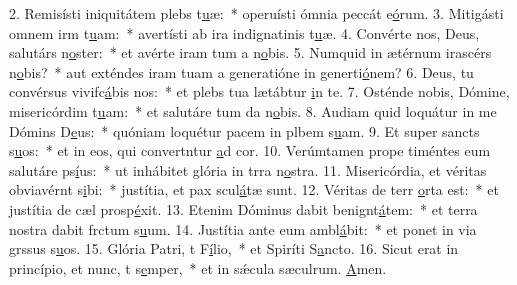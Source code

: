 2. Remisísti iniquitátem plebs t\uline{u}æ:~* operuísti ómnia peccát e\uline{ó}rum.
3. Mitigásti omnem irm t\uline{u}am:~* avertísti ab ira indignatinis t\uline{u}æ.
4. Convérte nos, Deus, salutárs n\uline{o}ster:~* et avérte iram tum a n\uline{o}bis.
5. Numquid in ætérnum irascérs n\uline{o}bis?~* aut exténdes iram tuam a generatióne in generti\uline{ó}nem?
6. Deus, tu convérsus vivifc\uline{á}bis nos:~* et plebs tua lætábtur \uline{i}n te.
7. Osténde nobis, Dómine, misericórdim t\uline{u}am:~* et salutáre tum da n\uline{o}bis.
8. Audiam quid loquátur in me Dómins D\uline{e}us:~* quóniam loquétur pacem in plbem s\uline{u}am.
9. Et super sancts s\uline{u}os:~* et in eos, qui convertntur \uline{a}d cor.
10. Verúmtamen prope timéntes eum salutáre ps\uline{í}us:~* ut inhábitet glória in trra n\uline{o}stra.
11. Misericórdia, et véritas obviavérnt s\uline{i}bi:~* justítia, et pax scul\uline{á}tæ sunt.
12. Véritas de terr \uline{o}rta est:~* et justítia de cæl prosp\uline{é}xit.
13. Etenim Dóminus dabit benignt\uline{á}tem:~* et terra nostra dabit frctum s\uline{u}um.
14. Justítia ante eum ambl\uline{á}bit:~* et ponet in via grssus s\uline{u}os.
15. Glória Patri, t F\uline{í}lio,~* et Spiríti S\uline{a}ncto.
16. Sicut erat in princípio, et nunc, t s\uline{e}mper,~* et in sǽcula sæculrum. \uline{A}men.

